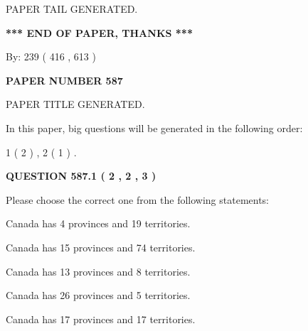 \documentclass[12pt]{article}
\begin{document}
   
   
\vspace{2.0in} PAPER TAIL GENERATED.
   
   
   
   
\vspace{1.0in} 
{\textbf{\large{ *** END OF PAPER, THANKS *** }}} 
   
   
\hspace{1.0in} By: 
 239 ( 416 ,  613 )
   
   
   
   
\newpage 
\setcounter{page}{ 
   587001 } 
   
   
   
   
 {\textbf{ \Large{ PAPER NUMBER  587  }}}
   
   
\vspace{0.2in}
   
   
   
   
   
   
   
   
 \vspace{0.2in}
 
 
 
 
   
   
 PAPER TITLE GENERATED.
   
   
   
\vspace{0.2in}
   
In this paper, big questions will be generated in the following order: 
   
   
   1 ( 2 )
 ,
   2 ( 1 )
 .
  
\vspace{0.2in}
  
{\textbf{\Large{QUESTION
587.1 
 ( 2 , 2 , 3 )
}}}
  
  
Please choose the correct one from the following statements:
 
 
Canada has   4 provinces and  19 territories.
 
 
Canada has  15 provinces and  74 territories.
 
 
Canada has  13 provinces and  8 territories.
 
 
Canada has  26 provinces and  5 territories.
 
 
Canada has  17 provinces and  17 territories.
 
\end{document}
